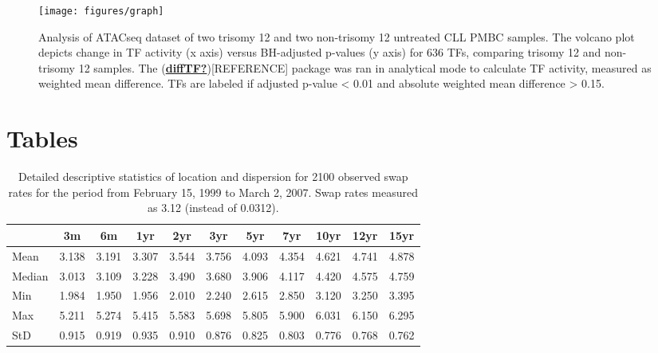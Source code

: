 \documentclass[11pt, a4paper, twosided]{book}
\begin{document}
\begin{figure}

{\centering \texttt{[image: figures/graph]} 

}

\caption{Analysis of ATACseq dataset of two trisomy 12 and two non-trisomy 12 untreated CLL PMBC samples. The volcano plot depicts change in TF activity (x axis) versus BH-adjusted p-values (y axis) for 636 TFs, comparing trisomy 12 and non-trisomy 12 samples. The (\protect\hyperlink{ref-diffTF}{\textbf{diffTF?}}){[}REFERENCE{]} package was ran in analytical mode to calculate TF activity, measured as weighted mean difference. TFs are labeled if adjusted p-value \textless{} 0.01 and absolute weighted mean difference \textgreater{} 0.15.}\label{fig:diffTFsmallvolPlot}
\end{figure}
\hypertarget{tables}{%
\section*{Tables}\label{tables}}
\begin{table}[ht]
    \begin{center}
        {\footnotesize
        \begin{tabular}{l|cccccccccc}
        \hline \hline
                        & 3m    & 6m    & 1yr   & 2yr   & 3yr   & 5yr   & 7yr   & 10yr  & 12yr  & 15yr   \\
            \hline
                Mean   & 3.138 & 3.191 & 3.307 & 3.544 & 3.756 & 4.093 & 4.354 & 4.621 & 4.741 & 4.878  \\
                Median & 3.013 & 3.109 & 3.228 & 3.490 & 3.680 & 3.906 & 4.117 & 4.420 & 4.575 & 4.759  \\
                Min    & 1.984 & 1.950 & 1.956 & 2.010 & 2.240 & 2.615 & 2.850 & 3.120 & 3.250 & 3.395  \\
                Max    & 5.211 & 5.274 & 5.415 & 5.583 & 5.698 & 5.805 & 5.900 & 6.031 & 6.150 & 6.295  \\
                StD    & 0.915 & 0.919 & 0.935 & 0.910 & 0.876 & 0.825 & 0.803 & 0.776 & 0.768 & 0.762  \\
            \hline \hline
        \end{tabular}}
    \end{center}
    \caption{Detailed descriptive statistics of location and dispersion for
    2100 observed swap rates for the period from
    February 15, 1999 to March 2, 2007. Swap rates measured as 3.12 (instead of 0.0312).}
    \label{tab:apptable}
\end{table}
\newpage
\end{document}
